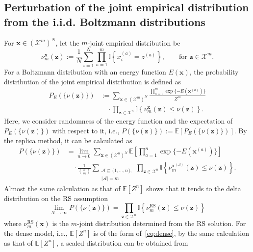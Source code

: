 \documentclass[conference,twocolumns]{IEEEtran}
\theoremstyle{plain}
\begin{document}
\subsection{Perturbation of the joint empirical distribution from the i.i.d. Boltzmann distributions}
For $\bm{x}\in(\mathcal{X}^m)^N$, let the $m$-joint empirical distribution be
\begin{equation*}
\nu_m^{\bm{x}}(\bm{z}) := \frac1N\sum_{i=1}^N \prod_{a=1}^m\mathbb{I}\left\{x_i^{(a)}=z^{(a)}\right\}, \hspace{2em} \text{for }\bm{z}\in\mathcal{X}^m.
\end{equation*}
For a Boltzmann distribution with an energy function $E(\bm{x})$, the probability distribution of the joint empirical distribution is defined as
\begin{align*}
P_E(\{\nu(\bm{z})\}) &:=\sum_{\bm{x}\in(\mathcal{X}^m)^N}\frac{\prod_{a=1}^m\exp\{-E(\bm{x}^{(a)})\}}{Z^m}\\
&\quad\cdot \prod_{\bm{z}\in\mathcal{X}^n}\mathbb{I}\left\{\nu_m^{\bm{x}}(\bm{z})\le \nu(\bm{z})\right\}.
\end{align*}
Here, we consider randomness of the energy function and the expectation of $P_E(\{\nu(\bm{z})\})$ with respect to it, i.e., $P(\{\nu(\bm{z})\}):=
\mathbb{E}[P_E(\{\nu(\bm{z})\})]$.
By the replica method, it can be calculated as~\cite{mezard2009ipa}
\begin{align*}
P(\{\nu(\bm{z})\}) &=\lim_{n\to 0}\sum_{\bm{x}\in(\mathcal{X}^n)^N}\mathbb{E}\left[\prod_{a=1}^n\exp\{-E(\bm{x}^{(a)})\}\right]\nonumber\\
&\quad\cdot \frac1{\binom{n}{m}}\sum_{\substack{\mathcal{A}\subseteq \{1,\dotsc,n\},\\|\mathcal{A}|=m}}
\prod_{\bm{z}\in\mathcal{X}^n}\mathbb{I}\left\{\nu_m^{\bm{x}^{(\mathcal{A})}}(\bm{z})\le \nu(\bm{z})\right\}.
\end{align*}
Almost the same calculation as that of $\mathbb{E}[Z^n]$ shows that 
it tends to the delta distribution on the RS assumption~\cite{mezard2009ipa}
\begin{equation*}
\lim_{N\to\infty} P(\{\nu(\bm{z})\}) = \prod_{\bm{z}\in\mathcal{X}^n}\mathbb{I}\left\{\nu_m^{\mathrm{RS}}(\bm{z})\le \nu(\bm{z})\right\}
\end{equation*}
where 
$\nu_m^{\mathrm{RS}}(\bm{x})$ is the $m$-joint distribution determined from the RS solution.
For the dense model, i.e., $\mathbb{E}[Z^n]$ is of the form of~\eqref{eq:dense},
by the same calculation as that of $\mathbb{E}[Z^n]$, a scaled distribution can be obtained from
\end{document}
